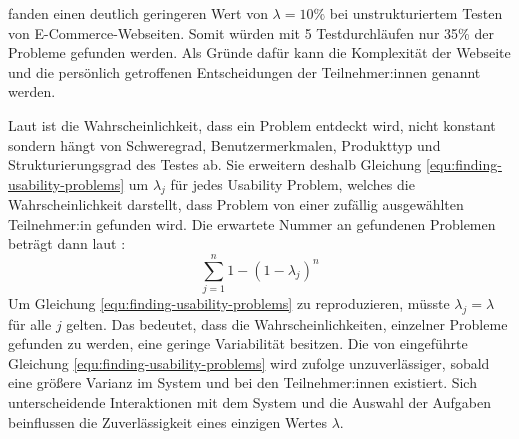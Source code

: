\textcite{spoolTestingWeb2001} fanden einen deutlich geringeren Wert von $\lambda{}=10\%$ bei
unstrukturiertem Testen von E-Commerce-Webseiten. Somit würden mit 5 Testdurchläufen nur 35\% der
Probleme gefunden werden. Als Gründe dafür kann die Komplexität der Webseite und die persönlich
getroffenen Entscheidungen der Teilnehmer:innen genannt werden.
\parencite{spoolTestingWeb2001}

Laut \textcite{woolrychWhyWhen2001} ist die Wahrscheinlichkeit, dass ein Problem entdeckt wird,
nicht konstant sondern hängt von Schweregrad, Benutzermerkmalen, Produkttyp und Strukturierungsgrad
des Testes ab. Sie erweitern deshalb Gleichung \ref{equ:finding-usability-problems} um
$\lambda{}_j$ für jedes Usability Problem, welches die Wahrscheinlichkeit darstellt, dass Problem
von einer zufällig ausgewählten Teilnehmer:in gefunden wird. Die erwartete Nummer an gefundenen
Problemen beträgt dann laut \textcite{woolrychWhyWhen2001}:
\begin{equation}
  \sum_{j=1}^n 1-(1-\lambda{}_j)^n
\end{equation}
Um Gleichung \ref{equ:finding-usability-problems} zu reproduzieren, müsste $\lambda{}_j =
  \lambda{}$ für alle $j$ gelten. Das bedeutet, dass die Wahrscheinlichkeiten, einzelner Probleme
gefunden zu werden, eine geringe Variabilität besitzen. Die von
\textcite{nielsenMathematicalModel1993} eingeführte Gleichung
\ref{equ:finding-usability-problems} wird \textcite{woolrychWhyWhen2001} zufolge
unzuverlässiger, sobald eine größere Varianz im System und bei den Teilnehmer:innen existiert. Sich
unterscheidende Interaktionen mit dem System und die Auswahl der Aufgaben beinflussen die
Zuverlässigkeit eines einzigen Wertes $\lambda{}$.
\parencite{woolrychWhyWhen2001}

